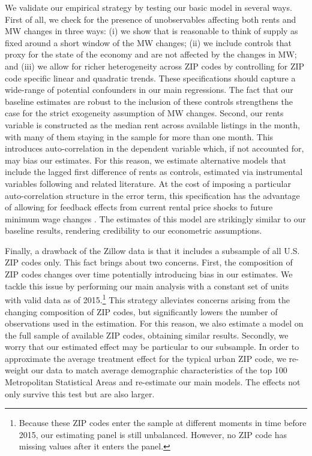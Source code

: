 We validate our empirical strategy by testing our basic model in several ways. First of 
all, we check for the presence of unobservables affecting both rents and MW changes in three 
ways: (i) we show that is reasonable to think of supply as fixed around a short window of the 
MW changes; (ii) we include controls that proxy for the state of the economy and are not affected 
by the changes in MW; and (iii) we allow for richer heterogeneity across ZIP codes by controlling 
for ZIP code specific linear and quadratic trends. 
These specifications should capture a wide-range of potential confounders in our main 
regressions. The fact that our baseline estimates are robust to the inclusion of these 
controls strengthens the case for the strict exogeneity assumption of MW changes. Second, 
our rents variable is constructed as the median rent across available listings in the month, 
with many of them staying in the sample for more than one month. This introduces 
auto-correlation in the dependent variable which, if not accounted for, may bias our estimates. 
For this reason, we estimate alternative models that include the lagged first difference of rents 
as controls, estimated via instrumental variables following \textcite{ArellanoBond1991} and 
related literature. At the cost of imposing a particular auto-correlation structure in the 
error term, this specification has the advantage of allowing for feedback effects from current 
rental price shocks to future minimum wage changes \parencite{ArellanoHonore2001}. The estimates 
of this model are strikingly similar to our baseline results, rendering credibility to our 
econometric assumptions.

Finally, a drawback of the Zillow data is that it includes a subsample of all U.S. ZIP codes 
only. This fact brings about two concerns. First, the composition of ZIP codes changes over 
time potentially introducing bias in our estimates. We tackle this issue by performing our 
main analysis with a constant set of units with valid data as of 2015.\footnote{Because these 
	ZIP codes enter the sample at different moments in time before 2015, our estimating panel 
	is still unbalanced. However, no ZIP code has missing values after it enters the panel.}
This strategy alleviates concerns arising from the changing composition of ZIP codes, but 
significantly lowers the number of observations used in the estimation. For this reason, we 
also estimate a model on the full sample of available ZIP codes, obtaining similar results. 
Secondly, we worry that our estimated effect may be particular to our subsample. In order to 
approximate the average treatment effect for the typical urban ZIP code, we re-weight our data 
to match average demographic characteristics of the top 100 Metropolitan Statistical Areas 
and re-estimate our main models. The effects not only survive this test but are also larger.

